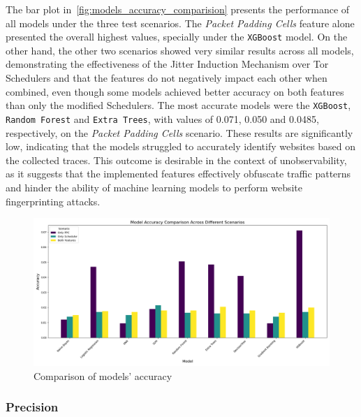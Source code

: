 The bar plot in~\autoref{fig:models_accuracy_comparision} presents the performance of all models under the three test scenarios. The \textit{Packet Padding Cells} feature alone presented the overall highest values, specially under the \texttt{XGBoost} model. On the other hand, the other two scenarios showed very similar results across all models, demonstrating the effectiveness of the Jitter Induction Mechanism over Tor Schedulers and that the features do not negatively impact each other when combined, even though some models achieved better accuracy on both features than only the modified Schedulers. 
The most accurate models were the \texttt{XGBoost}, \texttt{Random Forest} and \texttt{Extra Trees}, with values of 0.071, 0.050 and 0.0485, respectively, on the \textit{Packet Padding Cells} scenario. These results are significantly low, indicating that the models struggled to accurately identify websites based on the collected traces. This outcome is desirable in the context of unobservability, as it suggests that the implemented features effectively obfuscate traffic patterns and hinder the ability of machine learning models to perform website fingerprinting attacks. 

\begin{figure}[!h]
  \centering
  \includegraphics[width=\textwidth]{Chapters/Figures/Plots/obs-no-control/obs_Accuracy_comparison.png}
  \caption{Comparison of models' accuracy}\label{fig:models_accuracy_comparision}
\end{figure}
\FloatBarrier

\subsubsection{Precision}

